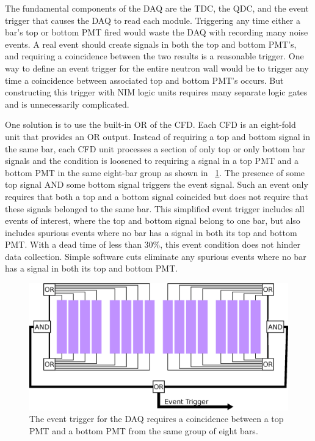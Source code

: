 The fundamental components of the DAQ are the TDC, the QDC, and the event trigger that causes the DAQ to read each module.  Triggering any time either a bar's top or bottom PMT fired would waste the DAQ with recording many noise events.  A real event should create signals in both the top and bottom PMT's, and requiring a coincidence between the two results is a reasonable trigger.  One way to define an event trigger for the entire neutron wall would be to trigger any time a coincidence between associated top and bottom PMT's occurs.  But constructing this trigger with NIM logic units requires many separate logic gates and is unnecessarily complicated.  

One solution is to use the built-in OR of the CFD.  Each CFD is an eight-fold unit that provides an OR output.  Instead of requiring a top and bottom signal in the same bar, each CFD unit processes a section of only top or only bottom bar signals and the condition is loosened to requiring a signal in a top PMT and a bottom PMT in the same eight-bar group as shown in {\fig}~\ref{fig:eventTrig}.  The presence of some top signal AND some bottom signal triggers the event signal.  Such an event only requires that both a top and a bottom signal coincided but does not require that these signals belonged to the same bar.  This simplified event trigger includes all events of interest, where the top and bottom signal belong to one bar, but also includes spurious events where no bar has a signal in both its top and bottom PMT.  With a dead time of less than 30\%, this event condition does not hinder data collection.  Simple software cuts eliminate any spurious events where no bar has a signal in both its top and bottom PMT.

\begin{figure}[htp]
\centering
\includegraphics[width=1.0\textwidth]{figures/event_trigger.eps}
\caption[DAQ event trigger.]{The event trigger for the DAQ requires a coincidence between a top PMT and a bottom PMT from the same group of eight bars.}
\label{fig:eventTrig}
\end{figure}

